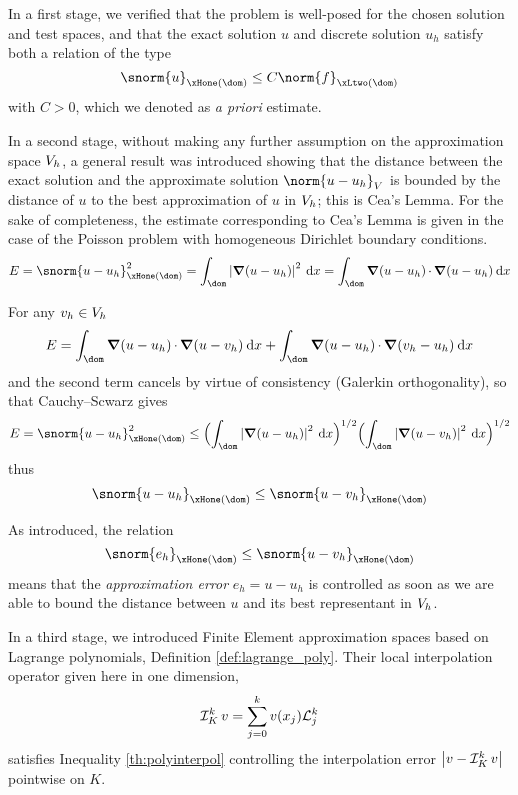 \medskip
In a first stage, we verified that the problem is well-posed for the chosen solution and test spaces, and that the exact solution $u$ and discrete solution $u_h$ satisfy both a relation of the type
\begin{equation*}
\snorm{u}_{\xHone(\dom)} \leq C \norm{f}_{\xLtwo(\dom)}
\end{equation*}
with $C > 0$, which we denoted as \textit{a priori} estimate.

\medskip
In a second stage, without making any further assumption on the approximation space ${{V}}_h$, a general result was introduced showing that the distance between the exact solution and the approximate solution $\norm{u - u_h}_{\xV}$ is bounded by the distance of $u$ to the best approximation of $u$ in ${{V}}_h$; this is Cea's Lemma.
For the sake of completeness, the estimate corresponding to Cea's Lemma is given in the case of the Poisson problem with homogeneous Dirichlet boundary conditions.
\begin{equation*}
E = \snorm{u - u_h}^2_{\xHone(\dom)} = \int_\dom \Abs{\Grad(u - u_h)}^2\md x = \int_\dom \Grad(u - u_h)\xDot\Grad(u - u_h) \md x
\end{equation*}

For any $v_h\in{{V}}_h$
\begin{equation*}
E = \int_\dom \Grad(u - u_h)\xDot\Grad(u - v_h) \md x + \int_\dom \Grad(u - u_h)\xDot\Grad(v_h - u_h) \md x
\end{equation*}
and the second term cancels by virtue of consistency (Galerkin orthogonality), so that Cauchy--Scwarz gives
\begin{equation*}
E = \snorm{u - u_h}^2_{\xHone(\dom)} \leq \Bigl(\int_\dom \Abs{\Grad(u - u_h)}^2 \md x\Bigr)^{1/2} \Bigl(\int_\dom \Abs{\Grad(u - v_h)}^2 \md x\Bigr)^{1/2}
\end{equation*}
thus
\begin{equation*}
\snorm{u - u_h}_{\xHone(\dom)} \leq \snorm{u - v_h}_{\xHone(\dom)}
\end{equation*}


As introduced, the relation
\begin{equation}\label{eq:error_estimate_h1}
\snorm{e_h}_{\xHone(\dom)} \leq \snorm{u - v_h}_{\xHone(\dom)}
\end{equation}
means that the \textit{approximation error} $e_h = u - u_h$ is controlled as soon as we are able to bound the distance between $u$ and its best representant in ${{V}}_h$.

\medskip
In a third stage, we introduced Finite Element approximation spaces based on Lagrange polynomials, Definition \ref{def:lagrange_poly}.
Their local interpolation operator given here in one dimension,
\begin{equation*}
\mathop{\mathcal{I}_{K}^{k}} v = \sum_{j=0}^k v(x_j) \mathcal L^{k}_{j}
\end{equation*}
satisfies Inequality \eqref{th:polyinterpol} controlling the interpolation error $\left\lvert v - \mathop{\mathcal{I}_{K}^{k}} v \right\rvert$ pointwise on $K$.

